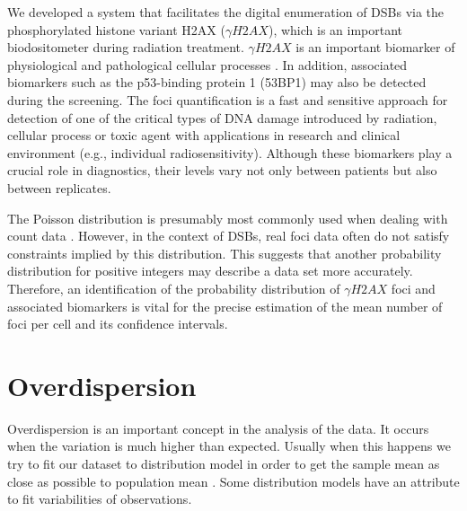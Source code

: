 We developed a system that facilitates the digital  enumeration of DSBs via the phosphorylated histone  variant H2AX ($\gamma H2AX$), which is an important  biodositometer during radiation treatment. $\gamma H2AX$ is an important biomarker of physiological and pathological cellular processes \citep{reddig_dna_2018,rodiger_quantification_2018}. In addition, associated biomarkers such as the p53-binding protein 1 (53BP1) may also be detected during the screening. The foci quantification is a fast and sensitive approach for detection of one of the critical types of DNA damage introduced by radiation, cellular process or toxic agent with applications in research and clinical environment (e.g., individual radiosensitivity). Although these biomarkers play a crucial role in diagnostics, their levels vary not only between patients but also between replicates.

The Poisson distribution is presumably most commonly used when dealing with count data \citep{morina_generalized_2015}. However, in the context of DSBs, real foci data often do not satisfy constraints implied by this distribution. This suggests that another probability distribution for positive integers may describe a data set more accurately. Therefore, an identification of the probability distribution of $\gamma H2AX$ foci and associated biomarkers is vital for the precise estimation of the mean number of foci per cell and its confidence intervals.


\section{Overdispersion}

Overdispersion is an important concept in the analysis of the data. It occurs when the variation is much higher than expected. Usually when this happens we try to fit our dataset to distribution model in order to get the sample mean as close as possible to population mean \citep{morina_generalized_2015}. Some distribution models have an attribute to fit variabilities of observations.

